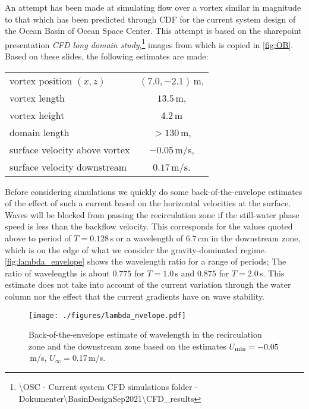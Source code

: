 \documentclass[a4paper,12pt]{article}
\let\underscore\_
\renewcommand{\_}[1]{_\mr{#1}}
\begin{document}
An attempt has been made at simulating flow over a vortex similar in magnitude to that which has been predicted through CDF for the current system design of the Ocean Basin of Ocean Space Center. 
This attempt is based on the sharepoint presentation \textit{CFD long domain study},\footnote{{\textbackslash}OSC - Current system CFD simulations folder - Dokumenter{\textbackslash}BasinDesignSep2021{\textbackslash}CFD{\underscore}results}
images from which is copied in \autoref{fig:OB}.
Based on these slides, the following estimates are made:
\begin{center}
\begin{tabular}{lc}
vortex position $(x,z)$ & $(7.0,-2.1)$\,m,\\
vortex length		& $13.5$\,m,\\
vortex height & 4.2\,m\\
domain length 	& $>130$\,m,\\
surface velocity above vortex & $-0.05$\,m/s,\\
surface velocity downstream & $0.17$\,m/s.
\end{tabular}
\end{center}

Before considering simulations we quickly do some back-of-the-envelope estimates of the effect of such a current based on the horizontal velocities at the surface.
Waves will be blocked from passing the recirculation zone if the still-water phase speed is less than the backflow velocity. 
This corresponds for the values quoted above to period of $T=0.128$\,s or a wavelength of $6.7$\,cm in the downstream zone, which is on the edge of what we consider the gravity-dominated regime. 
\autoref{fig:lambda_envelope} shows the wavelength ratio for a range of periods;
The ratio of wavelengths is about $0.775$ for $T=1.0$\,s and $0.875$ for $T=2.0$\,s.
This estimate does not take into account of the current variation through the water column nor the effect that the current gradients have on wave stability.
\\

\begin{figure}[h!ptb]%
\centering
\texttt{[image: ./figures/lambda\_envelope.pdf]}%
\caption{Back-of-the-envelope estimate of wavelength in the recirculation zone and the downstream zone based on the estimates $U\_{min} = -0.05$\,m/s, $U_\infty=0.17$\,m/s.}%
\label{fig:lambda_envelope}%
\end{figure}
\end{document}
